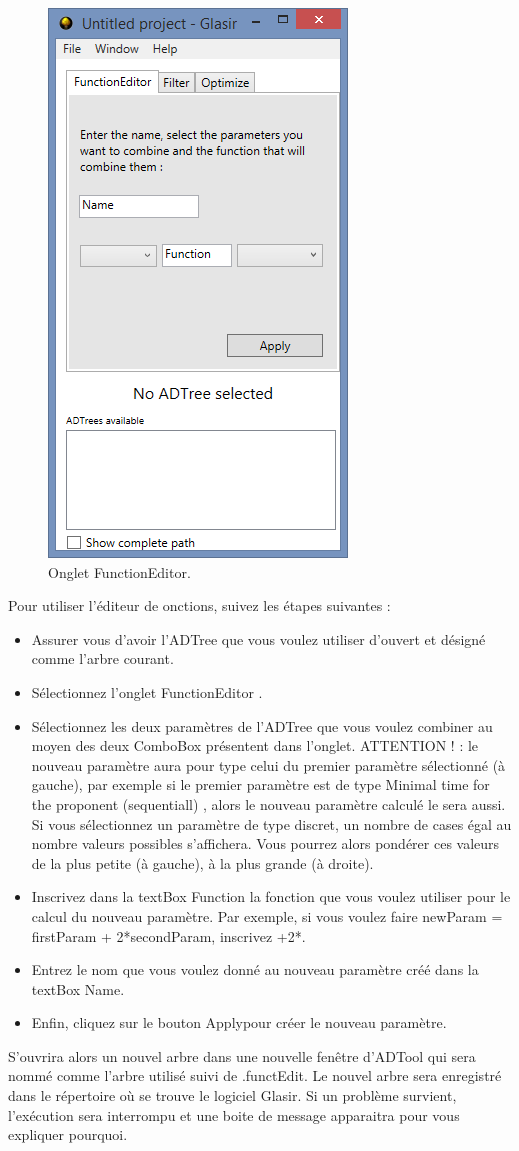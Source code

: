  \begin{figure}[!h]
        \centering
        \includegraphics[height=0.7\textwidth]{figure/functionEdition.png}
        \caption{Onglet FunctionEditor.}
        \label{fig:functEdit}
    \end{figure}

Pour utiliser l'éditeur de onctions, suivez les étapes suivantes : 
\begin{itemize}
\item Assurer vous d'avoir l'ADTree que vous voulez utiliser d'ouvert et désigné comme l'arbre courant. 
\item Sélectionnez l'onglet \og FunctionEditor \fg .
\item Sélectionnez les deux paramètres de l'ADTree que vous voulez combiner au moyen des deux ComboBox présentent dans l'onglet. ATTENTION  ! : le nouveau paramètre aura pour type celui du premier paramètre sélectionné (à gauche), par exemple si le premier paramètre est de type \og Minimal time for the proponent (sequentiall) \fg , alors le nouveau paramètre calculé le sera aussi. Si vous sélectionnez un paramètre de type discret, un nombre de cases égal au nombre valeurs possibles s'affichera. Vous pourrez alors pondérer ces valeurs de la plus petite (à gauche), à la plus grande (à droite).
\item Inscrivez dans la textBox \og Function \fg la fonction que vous voulez utiliser pour le calcul du nouveau paramètre. Par exemple, si vous voulez faire \og newParam = firstParam + 2*secondParam\fg , inscrivez \og +2*\fg .
\item Entrez le nom que vous voulez donné au nouveau paramètre créé dans la textBox \og Name\fg.
\item Enfin, cliquez sur le bouton \og Apply\fg pour créer le nouveau paramètre.
\end{itemize} 
S'ouvrira alors un nouvel arbre dans une nouvelle fenêtre d'ADTool qui sera nommé comme l'arbre utilisé suivi de \og .functEdit\fg . Le nouvel arbre sera enregistré dans le répertoire où se trouve le logiciel Glasir. 
Si un problème survient, l'exécution sera interrompu et une boite de message apparaitra pour vous expliquer pourquoi.

